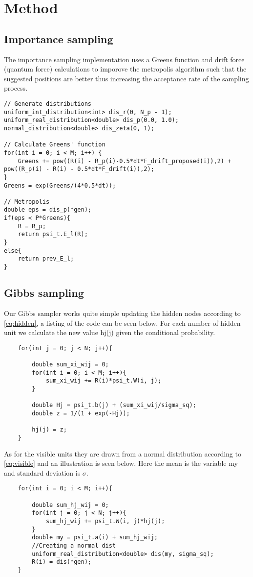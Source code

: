 \section{Method}
\subsection{Importance sampling}
The importance sampling implementation uses a Greens function and drift force (quantum force)
calculations to imporove the metropolis algorithm such that the suggested positions
are better thus increasing the acceptance rate of the sampling process.
\begin{lstlisting}
// Generate distributions
uniform_int_distribution<int> dis_r(0, N_p - 1);
uniform_real_distribution<double> dis_p(0.0, 1.0);
normal_distribution<double> dis_zeta(0, 1);

// Calculate Greens' function
for(int i = 0; i < M; i++) {
	Greens += pow((R(i) - R_p(i)-0.5*dt*F_drift_proposed(i)),2) + pow((R_p(i) - R(i) - 0.5*dt*F_drift(i)),2);
}
Greens = exp(Greens/(4*0.5*dt));

// Metropolis
double eps = dis_p(*gen);
if(eps < P*Greens){
	R = R_p;
	return psi_t.E_l(R);
}
else{
	return prev_E_l;
}
\end{lstlisting}

\subsection{Gibbs sampling}

Our Gibbs sampler works quite simple updating the hidden nodes according to \eqref{eq:hidden}, a listing of the code can be seen below. For each number of hidden unit we calculate the new value hj(j) given the conditional probability.

\begin{lstlisting}
    for(int j = 0; j < N; j++){

        double sum_xi_wij = 0;
        for(int i = 0; i < M; i++){
            sum_xi_wij += R(i)*psi_t.W(i, j);
        }

        double Hj = psi_t.b(j) + (sum_xi_wij/sigma_sq);
        double z = 1/(1 + exp(-Hj));

        hj(j) = z;
    }
\end{lstlisting}

As for the visible units they are drawn from a normal distribution according to \eqref{eq:visible} and an illustration is seen below. Here the mean is the variable my and standard deviation is $\sigma$.


\begin{lstlisting}
    for(int i = 0; i < M; i++){

        double sum_hj_wij = 0;
        for(int j = 0; j < N; j++){
            sum_hj_wij += psi_t.W(i, j)*hj(j);
        }
        double my = psi_t.a(i) + sum_hj_wij;
        //Creating a normal dist
        uniform_real_distribution<double> dis(my, sigma_sq);
        R(i) = dis(*gen);
    }
\end{lstlisting}

